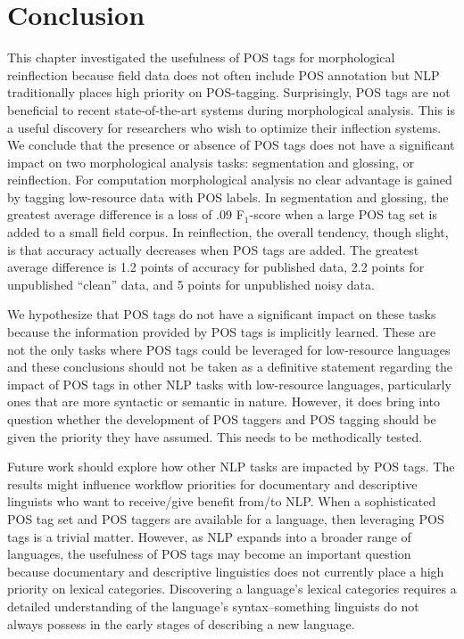 \section{Conclusion}

This chapter investigated the usefulness of POS tags for morphological reinflection because field data does not often include POS annotation but NLP traditionally places high priority on POS-tagging. Surprisingly, POS tags are not beneficial to recent state-of-the-art systems during morphological analysis. This is a useful discovery for researchers who wish to optimize their inflection systems. We conclude that the presence or absence of POS tags does not have a significant impact on two morphological analysis tasks: segmentation and glossing, or reinflection. For computation morphological analysis no clear advantage is gained by tagging low-resource data with POS labels. In segmentation and glossing, the greatest average difference is a loss of .09 F$_1$-score when a large POS tag set is added to a small field corpus. In reinflection, the overall tendency, though slight, is that accuracy actually decreases when POS tags are added. The greatest average difference is 1.2 points of accuracy for published data, 2.2 points for unpublished ``clean'' data, and 5 points for unpublished noisy data.

We hypothesize that POS tags do not have a significant impact on these tasks because the information provided by POS tags is implicitly learned. These are not the only tasks where POS tags could be leveraged for low-resource languages and these conclusions should not be taken as a definitive statement regarding the impact of POS tags in other NLP tasks with low-resource languages, particularly ones that are more syntactic or semantic in nature. However, it does bring into question whether the development of POS taggers and POS tagging should be given the priority they have assumed. This needs to be methodically tested. 

Future work should explore how other NLP tasks are impacted by POS tags. The results might influence workflow priorities for documentary and descriptive linguists who want to receive/give benefit from/to NLP. When a sophisticated POS tag set and POS taggers are available for a language, then leveraging POS tags is a trivial matter. However, as NLP expands into a broader range of languages, the usefulness of POS tags may become an important question because documentary and descriptive linguistics does not currently place a high priority on lexical categories. Discovering a language's lexical categories requires a detailed understanding of the language's syntax--something linguists do not always possess in the early stages of describing a new language. 

